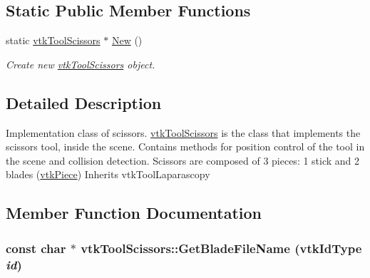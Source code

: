\subsection*{Static Public Member Functions}
\begin{DoxyCompactItemize}
\item 
\hypertarget{classvtkToolScissors_a00c8e052acea8d41f78968667009eea0}{
static \hyperlink{classvtkToolScissors}{vtkToolScissors} $\ast$ \hyperlink{classvtkToolScissors_a00c8e052acea8d41f78968667009eea0}{New} ()}
\label{classvtkToolScissors_a00c8e052acea8d41f78968667009eea0}

\begin{DoxyCompactList}\small\item\em Create new \hyperlink{classvtkToolScissors}{vtkToolScissors} object. \item\end{DoxyCompactList}\end{DoxyCompactItemize}


\subsection{Detailed Description}
Implementation class of scissors. \hyperlink{classvtkToolScissors}{vtkToolScissors} is the class that implements the scissors tool, inside the scene. Contains methods for position control of the tool in the scene and collision detection. Scissors are composed of 3 pieces: 1 stick and 2 blades (\hyperlink{classvtkPiece}{vtkPiece}) Inherits vtkToolLaparascopy 

\subsection{Member Function Documentation}
\hypertarget{classvtkToolScissors_a822f326f7203d378c73ea61de8636b25}{
\subsubsection[{GetBladeFileName}]{\setlength{\rightskip}{0pt plus 5cm}const char $\ast$ vtkToolScissors::GetBladeFileName (vtkIdType {\em id})}}
\label{classvtkToolScissors_a822f326f7203d378c73ea61de8636b25}


